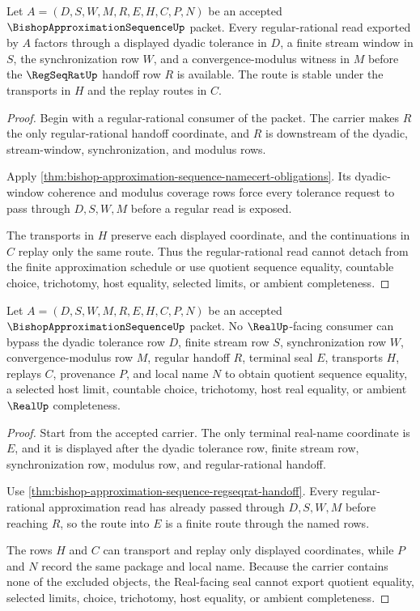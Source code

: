 \begin{theorem}
\label{thm:bishop-approximation-sequence-regseqrat-handoff}
Let $A=(D,S,W,M,R,E,H,C,P,N)$ be an accepted $\BishopApproximationSequenceUp$ packet. Every regular-rational read exported by $A$ factors through a displayed dyadic tolerance in $D$, a finite stream window in $S$, the synchronization row $W$, and a convergence-modulus witness in $M$ before the $\RegSeqRatUp$ handoff row $R$ is available. The route is stable under the transports in $H$ and the replay routes in $C$.
\end{theorem}
\begin{proof}
Begin with a regular-rational consumer of the packet. The carrier makes $R$ the only regular-rational handoff coordinate, and $R$ is downstream of the dyadic, stream-window, synchronization, and modulus rows.

Apply \autoref{thm:bishop-approximation-sequence-namecert-obligations}. Its dyadic-window coherence and modulus coverage rows force every tolerance request to pass through $D,S,W,M$ before a regular read is exposed.

The transports in $H$ preserve each displayed coordinate, and the continuations in $C$ replay only the same route. Thus the regular-rational read cannot detach from the finite approximation schedule or use quotient sequence equality, countable choice, trichotomy, host equality, selected limits, or ambient completeness.
\end{proof}

\begin{theorem}
\label{thm:bishop-approximation-sequence-real-seal-nonescape}
Let $A=(D,S,W,M,R,E,H,C,P,N)$ be an accepted $\BishopApproximationSequenceUp$ packet. No $\RealUp$-facing consumer can bypass the dyadic tolerance row $D$, finite stream row $S$, synchronization row $W$, convergence-modulus row $M$, regular handoff $R$, terminal seal $E$, transports $H$, replays $C$, provenance $P$, and local name $N$ to obtain quotient sequence equality, a selected host limit, countable choice, trichotomy, host real equality, or ambient $\RealUp$ completeness.
\end{theorem}
\begin{proof}
Start from the accepted carrier. The only terminal real-name coordinate is $E$, and it is displayed after the dyadic tolerance row, finite stream row, synchronization row, modulus row, and regular-rational handoff.

Use \autoref{thm:bishop-approximation-sequence-regseqrat-handoff}. Every regular-rational approximation read has already passed through $D,S,W,M$ before reaching $R$, so the route into $E$ is a finite route through the named rows.

The rows $H$ and $C$ can transport and replay only displayed coordinates, while $P$ and $N$ record the same package and local name. Because the carrier contains none of the excluded objects, the Real-facing seal cannot export quotient equality, selected limits, choice, trichotomy, host equality, or ambient completeness.
\end{proof}

